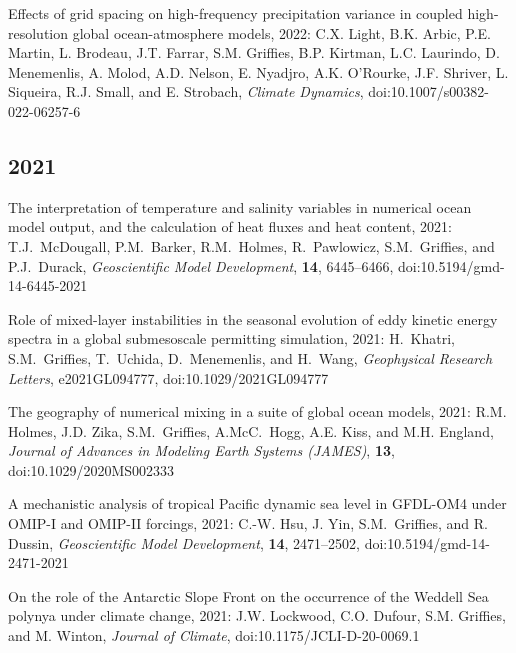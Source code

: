 \begin{etaremune}
\item Effects of grid spacing on high-frequency precipitation variance in coupled high-resolution global ocean-atmosphere models, 2022: C.X. Light, B.K. Arbic, P.E. Martin, L. Brodeau, J.T. Farrar, S.M. Grif\/f\/ies, B.P. Kirtman, L.C. Laurindo,  D. Menemenlis, A. Molod, A.D. Nelson, E. Nyadjro, A.K. O'Rourke,  J.F. Shriver, L. Siqueira, R.J. Small, and E. Strobach, {\it Climate Dynamics}, doi:10.1007/s00382-022-06257-6


\subsection*{\sc \color{Maroon} 2021}

\item The interpretation of temperature and salinity variables in numerical ocean model output, and the calculation of heat fluxes and heat content, 2021: T.J.\ McDougall, P.M.\ Barker, R.M.\ Holmes, R.\ Pawlowicz, S.M.\ Grif\/f\/ies, and P.J.\ Durack, {\it Geoscientific Model Development}, {\bf 14}, 6445–6466, doi:10.5194/gmd-14-6445-2021



\item Role of mixed-layer instabilities in the seasonal evolution of eddy kinetic energy spectra in a global submesoscale permitting simulation, 2021: H.\ Khatri, S.M.\ Grif\/f\/ies, T.\ Uchida, D.\ Menemenlis, and H.\ Wang, {\it  Geophysical Research Letters}, e2021GL094777, doi:10.1029/2021GL094777

\item The geography of numerical mixing in a suite of global ocean models, 2021: R.M. Holmes, J.D. Zika, S.M.\ Grif\/f\/ies,  A.McC.\ Hogg, A.E. Kiss, and M.H. England, {\it Journal of Advances in Modeling Earth Systems (JAMES)}, {\bf 13},  \\ doi:10.1029/2020MS002333

\item A mechanistic analysis of tropical Pacific dynamic sea level in GFDL-OM4 under OMIP-I and OMIP-II forcings, 2021: C.-W. Hsu, J. Yin, S.M.\ Grif\/f\/ies, and R. Dussin, {\it Geoscientific Model Development}, {\bf 14}, 2471--2502, doi:10.5194/gmd-14-2471-2021

\item On the role of the Antarctic Slope Front on the occurrence of the Weddell Sea polynya under climate change, 2021: J.W. Lockwood, C.O. Dufour, S.M. Grif\/f\/ies, and M. Winton, {\it Journal of Climate}, doi:10.1175/JCLI-D-20-0069.1


\end{etaremune}
